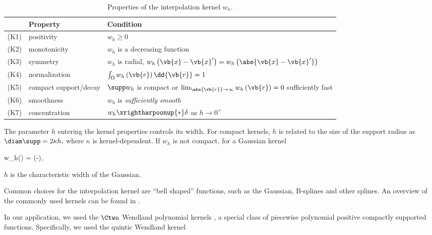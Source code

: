 \documentclass[../main.tex]{subfiles}
\begin{document}
\begin{table}[H]
	\centering
	\caption{Properties of the interpolation kernel $w_h$.}
	\label{tab:kernel-properties}
	\begin{tabular}{@{}cll@{}}
		\toprule
		& Property & Condition \\
		\midrule
		(K1) & positivity & $w_h \geq 0$ \\
		(K2) & monotonicity & $w_h$ is a decreasing function \\
		(K3) & symmetry & $w_h$ is radial, \ie $w_h\left(\vb{x} - \vb{x}'\right) = w_h\left(\abs{\vb{x} - \vb{x}'}\right)$ \\
		(K4) & normalization & $\int_{\Omega}w_h\left(\vb{r}\right)\dd{\vb{r}} = 1$ \\
		(K5) & compact support/decay & $\supp w_h$ is compact or $\lim_{\abs{\vb{r}} \to \infty}w_h\left(\vb{r}\right) = 0$ sufficiently fast \\
		(K6) & smoothness & $w_h$ is \emph{sufficiently smooth} \\
		(K7) & concentration & $w_h \xrightharpoonup{*} \delta$ as $h \to 0^+$ \\
		\bottomrule
	\end{tabular}
\end{table}

The parameter $h$ entering the kernel properties controls its width. For compact kernels, $h$ is related to the size of the support radius as $\diam \supp = 2 \kappa h,$ where $\kappa$ is kernel-dependent. If $w_h$ is not compact, \eg for a Gaussian kernel \autocite[p.~8]{monaghanSmoothedParticleHydrodynamics2005} 

\begin{equations}[single,*]
w_h\left(\right) = \exp\left(-\right),
\end{equations}

$h$ is the characteristic width of the Gaussian.

Common choices for the interpolation kernel are \enquote{bell shaped} functions, such as the Gaussian, B-splines \autocite{monaghanExtrapolatingSplinesInterpolation1985} and other splines. An overview of the commonly used kernels can be found in \autocite[p.~62]{liuSmoothedParticleHydrodynamics2004}. 

In our application, we used the $\Ctwo$ Wendland polynomial kernels \autocite{wendlandPiecewisePolynomialPositive1995}\autocite{dehnenNewKernelsSPH2012}, \ie a special class of piecewise polynomial positive compactly supported functions. Specifically, we used the quintic Wendland kernel 
\end{document}
